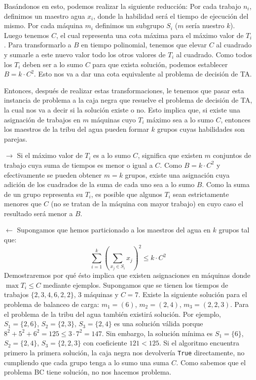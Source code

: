 \documentclass{article}
\begin{document}
Basándonos en esto, podemos realizar la siguiente reducción:
Por cada trabajo $n_i$, definimos un maestro agua $x_i$, donde la habilidad será el tiempo de ejecución del mismo. Por cada máquina $m_i$ definimos un subgrupo $S_i$ ($m$ sería nuestro $k$).
Luego tenemos $C$, el cual representa una cota máxima para el máximo valor de $T_i$. Para transformarlo a $B$ en tiempo polinomial, tenemos que elevar $C$ al cuadrado y sumarle a este nuevo valor todo los otros valores de $T_i$ al cuadrado. Como todos los $T_i$ deben ser a lo sumo $C$ para que exista solución, podemos establecer $B = k \cdot C^2$. Esto nos va a dar una cota equivalente al problema de decisión de TA.

Entonces, después de realizar estas transformaciones, le tenemos que pasar esta instancia de problema a la caja negra que resuelve el problema de decisión de TA, la cual nos va a decir si la solución existe o no. Esto implica que, si existe una asignación de trabajos en $m$ máquinas cuyo $T_i$ máximo sea a lo sumo $C$, entonces los maestros de la tribu del agua pueden formar $k$ grupos cuyas habilidades son parejas.

$\rightarrow$ Si el máximo valor de $T_i$ es a lo sumo $C$, significa que existen $m$ conjuntos de trabajo cuya suma de tiempos es menor o igual a $C$. Como $B = k \cdot C^2$ y efectivamente se pueden obtener $m = k$ grupos, existe una asignación cuya adición de los cuadrados de la suma de cada uno sea a lo sumo $B$. Como la suma de un grupo representa su $T_i$, es posible que algunos $T_i$ sean estrictamente menores que $C$ (no se tratan de la máquina con mayor trabajo) en cuyo caso el resultado será menor a $B$. 

$\leftarrow$ Supongamos que hemos particionado a los maestros del agua en \( k \) grupos tal que:
\[
\sum_{i=1}^{k} \left( \sum_{x_j \in S_i} x_j \right)^2 \leq k \cdot C^2
\]
Demostraremos por qué ésto implica que existen asignaciones en máquinas donde $\max T_i \leq C$ mediante ejemplos. Supongamos que se tienen los tiempos de trabajos $\{2, 3, 4, 6, 2, 2\}$, 3 máquinas y $C = 7$. Existe la siguiente solución para el problema de balanceo de carga: $m_1 = (6)$, $m_2 = (2, 4)$, $m_3 = (2, 2, 3)$. Para el problema de la tribu del agua también existirá solución. Por ejemplo, $S_1 = \{2, 6\}$, $S_2 = \{2, 3\}$, $S_3 = \{2, 4\}$ es una solución válida porque $8^2 + 5^2 + 6^2 = 125 \leq 3 \cdot 7^2 = 147$. Sin embargo, la solución mínima es $S_1 = \{6\}$, $S_2 = \{2, 4\}$, $S_3 = \{2, 2, 3\}$ con coeficiente $121 < 125$.  Si el algoritmo encuentra primero la primera solución, la caja negra nos devolvería \texttt{True} directamente, no cumpliendo que cada grupo tenga a lo sumo una suma $C$. Como sabemos que el problema BC tiene solución, no nos hacemos problema. 
\end{document}
